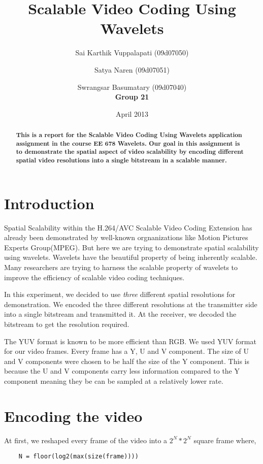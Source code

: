\documentclass[10pt,twocolumn]{article}
\title{Scalable Video Coding Using Wavelets}
\author{Sai Karthik Vuppalapati (09d07050) \\
\and Satya Naren (09d07051) \\
\and Swrangsar Basumatary (09d07040) \\
\textbf{Group 21}}
\date{April 2013}
\begin{document}
\maketitle

\begin{abstract}
    \textbf{This is a report for the Scalable Video Coding Using Wavelets application assignment in the course EE 678 Wavelets. Our goal in this assignment is to demonstrate the spatial aspect of video scalability by encoding different spatial video resolutions into a single bitstream in a scalable manner.}
\end{abstract}

\section{Introduction}

Spatial Scalability within the H.264/AVC Scalable Video Coding Extension has already been demonstrated\cite{segall2007} by well-known orgnanizations like Motion Pictures Experts Group(MPEG). But here we are trying to demonstrate spatial scalability using wavelets. Wavelets have the beautiful property of being inherently scalable. Many researchers are trying to harness the scalable property of wavelets to improve the efficiency of scalable video coding techniques.

In this experiment, we decided to use \emph{three} different spatial resolutions for demonstration. We encoded the three different resolutions at the transmitter side into a single bitstream and transmitted it. At the receiver, we decoded the bitstream to get the resolution required.

The YUV format is known to be more efficient than RGB. We used YUV format for our video frames. Every frame has a Y, U and V component. The size of U and V components were chosen to be half the size of the Y component. This is because the U and V components carry less information compared to the Y component meaning they be can be sampled at a relatively lower rate.

\section{Encoding the video}

At first, we reshaped every frame of the video into a $2^N * 2^N$ square frame where,
\begin{verbatim}
    N = floor(log2(max(size(frame))))
\end{verbatim}
\end{document}
